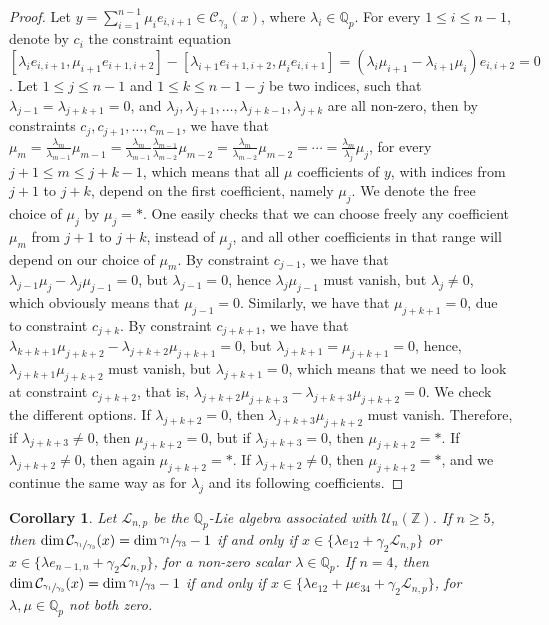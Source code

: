 \documentclass[12pt]{article}
\newtheorem{corollary}[theorem]{Corollary}
\begin{document}
\begin{proof}
Let $y=\sum_{i=1}^{n-1}\mu_i e_{i,i+1}\in\mathcal{C}_{\gamma_3}(x)$, where $\lambda_i\in\mathbb{Q}_p$.
For every $1\leq i\leq n-1$, denote by $c_i$ the constraint equation $[\lambda_i e_{i,i+1},\mu_{i+1}e_{i+1,i+2}]-[\lambda_{i+1}e_{i+1,i+2},\mu_i e_{i,i+1}]=(\lambda_i\mu_{i+1}-\lambda_{i+1}\mu_i)e_{i,i+2}=0$. Let $1\leq j\leq n-1$ and $1\leq k\leq n-1-j$ be two indices, such that $\lambda_{j-1}=\lambda_{j+k+1}=0$, and $\lambda_j,\lambda_{j+1},\dots,\lambda_{j+k-1},\lambda_{j+k}$ are all non-zero, then by constraints $c_j,c_{j+1},\dots,c_{m-1}$, we have that $\mu_m=\frac{\lambda_m}{\lambda_{m-1}}\mu_{m-1}=\frac{\lambda_m}{\lambda_{m-1}}\frac{\lambda_{m-1}}{\lambda_{m-2}}\mu_{m-2}=\frac{\lambda_m}{\lambda_{m-2}}\mu_{m-2}=\cdots=\frac{\lambda_m}{\lambda_j}\mu_j$, for every $j+1\leq m\leq j+k-1$, which means that all $\mu$ coefficients of $y$, with indices from $j+1$ to $j+k$, depend on the first coefficient, namely $\mu_j$. We denote the free choice of $\mu_j$ by $\mu_j=\ast$. One easily checks that we can choose freely any coefficient $\mu_m$ from $j+1$ to $j+k$, instead of $\mu_j$, and all other coefficients in that range will depend on our choice of $\mu_m$. By constraint $c_{j-1}$, we have that $\lambda_{j-1}\mu_j-\lambda_j\mu_{j-1}=0$, but $\lambda_{j-1}=0$, hence $\lambda_j\mu_{j-1}$ must vanish, but $\lambda_j\neq 0$, which obviously means that $\mu_{j-1}=0$. Similarly, we have that $\mu_{j+k+1}=0$, due to constraint $c_{j+k}$. By constraint $c_{j+k+1}$, we have that $\lambda_{k+k+1}\mu_{j+k+2}-\lambda_{j+k+2}\mu_{j+k+1}=0$, but $\lambda_{j+k+1}=\mu_{j+k+1}=0$, hence, $\lambda_{j+k+1}\mu_{j+k+2}$ must vanish, but $\lambda_{j+k+1}=0$, which means that we need to look at constraint $c_{j+k+2}$, that is, $\lambda_{j+k+2}\mu_{j+k+3}-\lambda_{j+k+3}\mu_{j+k+2}=0$. We check the different options.
If $\lambda_{j+k+2}=0$, then $\lambda_{j+k+3}\mu_{j+k+2}$ must vanish. Therefore, if $\lambda_{j+k+3}\neq 0$, then $\mu_{j+k+2}=0$, but if $\lambda_{j+k+3}=0$, then $\mu_{j+k+2}=\ast$. If $\lambda_{j+k+2}\neq 0$, then again $\mu_{j+k+2}=\ast$. If $\lambda_{j+k+2}\neq 0$, then $\mu_{j+k+2}=\ast$, and we continue the same way as for $\lambda_j$ and its following coefficients.
\end{proof}
\begin{corollary}
\label{prop.n.geq.4.centralizer.codimension}
Let $\mathcal{L}_{n,p}$ be the $\mathbb{Q}_p$-Lie algebra associated with $\mathcal{U}_n(\mathbb{Z})$. If $n\geq 5$, then $\dim\mathcal{C}_{\sfrac{\gamma_1}{\gamma_3}}(x)=\dim\sfrac{\gamma_1}{\gamma_3}-1$ if and only if $x\in\{\lambda e_{12}+\gamma_2\mathcal{L}_{n,p}\}$ or $x\in\{\lambda e_{n-1,n}+\gamma_2\mathcal{L}_{n,p}\}$, for a non-zero scalar $\lambda\in\mathbb{Q}_p$. If $n=4$, then $\dim\mathcal{C}_{\sfrac{\gamma_1}{\gamma_3}}(x)=\dim\sfrac{\gamma_1}{\gamma_3}-1$ if and only if $x\in\{\lambda e_{12}+\mu e_{34}+\gamma_2\mathcal{L}_{n,p}\}$, for $\lambda,\mu\in\mathbb{Q}_p$ not both zero.
\end{corollary}
\end{document}
